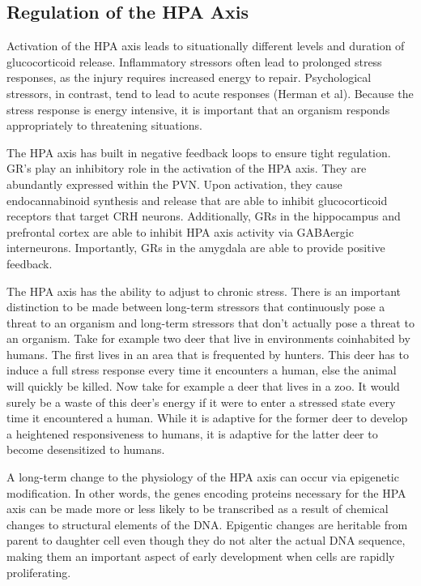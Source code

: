 \documentclass[12pt,twoside]{reedthesis}
\begin{document}
\subsection{Regulation of the HPA Axis}
Activation of the HPA axis leads to situationally different levels and duration of
glucocorticoid release. Inflammatory stressors often lead to prolonged stress
responses, as the injury requires increased energy to repair. Psychological
stressors, in contrast, tend to lead to acute responses (Herman et al). Because
the stress response is energy intensive, it is important that an organism
responds appropriately to threatening situations.

The HPA axis has built in negative feedback loops to ensure tight regulation.
GR's play an inhibitory role in the activation of the HPA axis. They are abundantly expressed
within the PVN. Upon activation, they cause endocannabinoid synthesis and
release that are able to inhibit glucocorticoid receptors that target CRH
neurons. Additionally, GRs in the hippocampus and prefrontal cortex are able to
inhibit HPA axis activity via GABAergic interneurons. Importantly, GRs in the
amygdala are able to provide positive feedback. 

The HPA axis has the ability to adjust to chronic stress. There is an
important distinction to be made between long-term stressors that continuously
pose a threat to an organism and long-term stressors that don't actually pose a
threat to an organism. Take for example two deer that live in environments
coinhabited by humans. The first lives in an area that is
frequented by hunters. This deer has to induce a full stress response
every time it encounters a human, else the animal will quickly be killed.
Now take for example a deer that lives in a zoo. It would surely be a waste of this deer's
energy if it were to enter a stressed state every time it encountered a human.
While it is adaptive for the former deer to develop a heightened responsiveness
to humans, it is adaptive for the latter deer to become desensitized to humans.

A long-term change to the physiology of the HPA axis can occur via epigenetic
modification. In other words, the genes encoding proteins necessary for the HPA
axis can be made more or less likely to be transcribed as a result of chemical
changes to structural elements of the DNA. Epigentic changes are heritable from
parent to daughter cell
even though they do not alter the actual DNA sequence, making them an important aspect of early development when cells are rapidly proliferating. 
\end{document}
